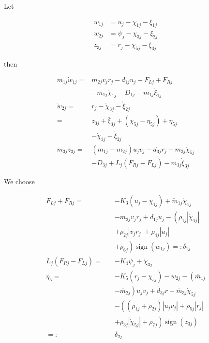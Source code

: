 \documentclass[10pt]{article}
\begin{document}
Let

$$
\begin{aligned}
w_{1 j} & =u_{j}-\chi_{1 j}-\xi_{1 j} \\
w_{2 j} & =\psi_{j}-\chi_{3 j}-\xi_{2 j} \\
z_{3 j} & =r_{j}-\chi_{5 j}-\xi_{3 j}
\end{aligned}
$$

then

$$
\begin{aligned}
m_{1 j} \grave{w}_{1 j}= & m_{2 j} v_{j} r_{j}-d_{1 j} u_{j}+F_{L j}+F_{R j} \\
& -m_{1 j} \grave{\chi}_{1 j}-D_{1 j}-m_{1 j} \grave{\xi}_{1 j} \\
\grave{w}_{2 j}= & r_{j}-\grave{\chi}_{3 j}-\grave{\xi}_{2 j} \\
= & z_{3 j}+\bar{\xi}_{3 j}+\left(\chi_{5 j}-\eta_{5 j}\right)+\eta_{5 j} \\
& -\grave{\chi}_{3 j}-\grave{\xi}_{2 j} \\
m_{3 j} \grave{z}_{3 j}= & \left(m_{1 j}-m_{2 j}\right) u_{j} v_{j}-d_{3 j} r_{j}-m_{3 j} \grave{\chi}_{5 j} \\
& -D_{3 j}+L_{j}\left(F_{R j}-F_{L j}\right)-m_{3 j} \grave{\xi}_{3 j}
\end{aligned}
$$

We choose

$$
\begin{aligned}
F_{L j}+F_{R j}=\quad & -K_{3}\left(u_{j}-\chi_{1 j}\right)+\overleftarrow{m}_{1 j} \grave{\chi}_{1 j} \\
& -\bar{m}_{2 j} v_{j} r_{j}+\bar{d}_{1 j} u_{j}-\left(\rho_{1 j}\left|\grave{\chi}_{1 j}\right|\right. \\
& +\rho_{2 j}\left|v_{j} r_{j}\right|+\rho_{4 j}\left|u_{j}\right| \\
& \left.+\rho_{6 j}\right) \operatorname{sign}\left(w_{1 j}\right)=: \delta_{1 j} \\
L_{j}\left(F_{R j}-F_{L j}\right)=\quad & -K_{4} \psi_{j}+\grave{\chi}_{3 j} \\
\eta_{5}=\quad & -K_{5}\left(r_{j}-\chi_{s j}\right)-w_{2 j}-\left(\bar{m}_{1 j}\right. \\
& \left.-\bar{m}_{2 j}\right) u_{j} v_{j}+\bar{d}_{3 j} r+\bar{m}_{3 j} \grave{\chi}_{5 j} \\
& -\left(\left(\rho_{1 j}+\rho_{2 j}\right)\left|u_{j} v_{j}\right|+\rho_{5 j}\left|r_{j}\right|\right. \\
& \left.+\rho_{3 j}\left|\grave{\chi}_{5 j}\right|+\rho_{7 j}\right) \operatorname{sign}\left(z_{3 j}\right) \\
=: & \delta_{2 j}
\end{aligned}
$$
\end{document}

